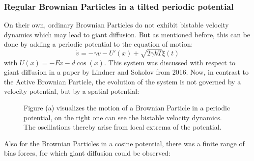 \documentclass[12pt,a4paper]{article}
\begin{document}
\subsubsection{Regular Brownian Particles in a tilted periodic potential}
On their own, ordinary Brownian Particles do not exhibit bistable velocity dynamics which may lead to giant diffusion. But as mentioned before, this can be done by adding a periodic potential to the equation of motion:
\begin{equation}
\dot{v}=-\gamma v-U'(x)+\sqrt{2\gamma kT}\xi(t)
\end{equation}
with $U(x)=-Fx-d\cos(x)$. This system was discussed with respect to giant diffusion in a paper by Lindner and Sokolov from 2016\cite{bpp}. Now, in contrast to the Active Brownian Particle, the evolution of the system is not governed by a velocity potential, but by a spatial potential:
\begin{figure}[H]
	\caption{Figure (a) visualizes the motion of a Brownian Particle in a periodic potential, on the right one can see the bistable velocity dynamics. The oscillations thereby arise from local extrema of the potential.}
	\label{veldyn} 
\end{figure}
Also for the Brownian Particles in a cosine potential, there was a finite range of bias forces, for which giant diffusion could be observed:
\end{document}
